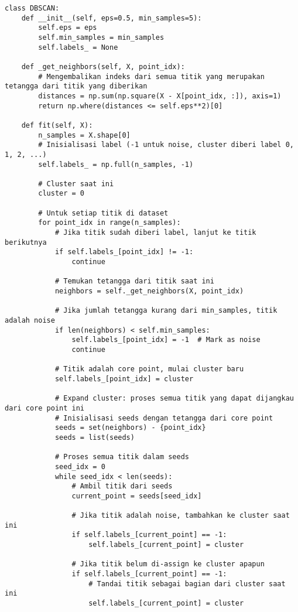 \documentclass[a4paper,12pt]{article}
\begin{document}
\begin{lstlisting}
class DBSCAN:
    def __init__(self, eps=0.5, min_samples=5):
        self.eps = eps
        self.min_samples = min_samples
        self.labels_ = None
    
    def _get_neighbors(self, X, point_idx):
        # Mengembalikan indeks dari semua titik yang merupakan tetangga dari titik yang diberikan
        distances = np.sum(np.square(X - X[point_idx, :]), axis=1)
        return np.where(distances <= self.eps**2)[0]
    
    def fit(self, X):
        n_samples = X.shape[0]
        # Inisialisasi label (-1 untuk noise, cluster diberi label 0, 1, 2, ...)
        self.labels_ = np.full(n_samples, -1)
        
        # Cluster saat ini
        cluster = 0
        
        # Untuk setiap titik di dataset
        for point_idx in range(n_samples):
            # Jika titik sudah diberi label, lanjut ke titik berikutnya
            if self.labels_[point_idx] != -1:
                continue
                
            # Temukan tetangga dari titik saat ini
            neighbors = self._get_neighbors(X, point_idx)
            
            # Jika jumlah tetangga kurang dari min_samples, titik adalah noise
            if len(neighbors) < self.min_samples:
                self.labels_[point_idx] = -1  # Mark as noise
                continue
                
            # Titik adalah core point, mulai cluster baru
            self.labels_[point_idx] = cluster
            
            # Expand cluster: proses semua titik yang dapat dijangkau dari core point ini
            # Inisialisasi seeds dengan tetangga dari core point
            seeds = set(neighbors) - {point_idx}
            seeds = list(seeds)
            
            # Proses semua titik dalam seeds
            seed_idx = 0
            while seed_idx < len(seeds):
                # Ambil titik dari seeds
                current_point = seeds[seed_idx]
                
                # Jika titik adalah noise, tambahkan ke cluster saat ini
                if self.labels_[current_point] == -1:
                    self.labels_[current_point] = cluster
                
                # Jika titik belum di-assign ke cluster apapun
                if self.labels_[current_point] == -1:
                    # Tandai titik sebagai bagian dari cluster saat ini
                    self.labels_[current_point] = cluster
                    

\end{lstlisting}
\end{document}
